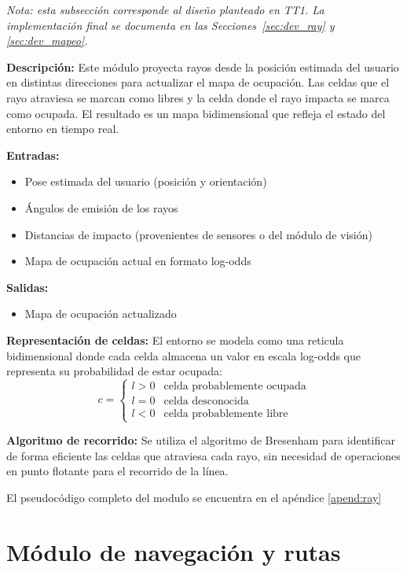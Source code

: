\textit{Nota: esta subsección corresponde al diseño planteado en TT1. La
implementación final se documenta en las Secciones~\ref{sec:dev_ray} y
\ref{sec:dev_mapeo}.}

\textbf{Descripción:}
Este módulo proyecta rayos desde la posición estimada del usuario en distintas
direcciones para actualizar el mapa de ocupación. Las celdas que el rayo atraviesa se
marcan como libres y la celda donde el rayo impacta se marca como ocupada. El resultado
es un mapa bidimensional que refleja el estado del entorno en tiempo real.

\textbf{Entradas:}
\begin{itemize}
    \item Pose estimada del usuario (posición y orientación)
    \item Ángulos de emisión de los rayos
    \item Distancias de impacto (provenientes de sensores o del módulo de visión)
    \item Mapa de ocupación actual en formato log-odds
\end{itemize}

\textbf{Salidas:}
\begin{itemize}
    \item Mapa de ocupación actualizado
\end{itemize}

\textbf{Representación de celdas:}
El entorno se modela como una reticula bidimensional donde cada celda almacena un valor
en escala log-odds que representa su probabilidad de estar ocupada:
\[
c =
\begin{cases}
l > 0 & \text{celda probablemente ocupada} \\
l = 0 & \text{celda desconocida} \\
l < 0 & \text{celda probablemente libre}
\end{cases}
\]

\textbf{Algoritmo de recorrido:} Se utiliza el algoritmo de Bresenham para identificar
de forma eficiente las celdas que atraviesa cada rayo, sin necesidad de operaciones en
punto flotante para el recorrido de la línea. 

El pseudocódigo completo del modulo se encuentra en el apéndice \ref{apend:ray}



\section{Módulo de navegación y rutas}

